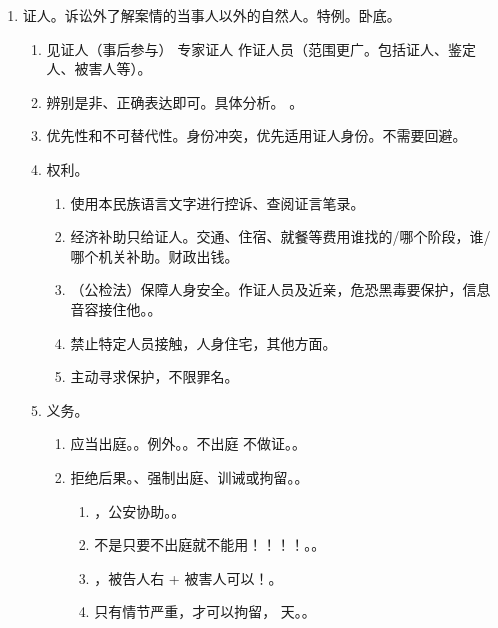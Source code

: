 \begin{enumerate}
  \item 证人。诉讼外了解案情的当事人以外的自然人。特例。卧底。
        \begin{enumerate}
          \item \bdy 见证人（事后参与） \bdy 专家证人 \bdy 作证人员（范围更广。包括证人、鉴定人、被害人等）。
          \item 辨别是非、正确表达即可。具体分析。
                。
          \item 优先性和不可替代性。身份冲突，优先适用证人身份。不需要回避。
          \item 权利。
                \begin{enumerate}
                  \item 使用本民族语言文字进行控诉、查阅证言笔录。
                  \item 经济补助只给证人。交通、住宿、就餐等费用谁找的/哪个阶段，谁/哪个机关补助。财政出钱。
                  \item （公检法）保障人身安全。作证人员及近亲，危恐黑毒要保护，信息音容接住他。。
                  \item 禁止特定人员接触，人身住宅，其他方面。
                  \item 主动寻求保护，不限罪名。
                \end{enumerate}
          \item 义务。
                \begin{enumerate}
                  \item 应当出庭。。例外。。不出庭 \bdy 不做证。。
                  \item 拒绝后果。、强制出庭、训诫或拘留。。
                        \begin{enumerate}
                          \item {}，公安协助。。
                          \item 不是只要不出庭就不能用！！！！。。
                          \item {}，被告人右 + 被害人可以！\al{ \cuo}。
                          \item 只有情节严重，才可以拘留， 天。。
                        \end{enumerate}

\end{enumerate}
\end{enumerate}
\end{enumerate}
